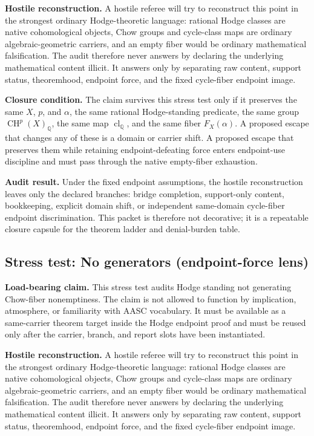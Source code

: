 \documentclass[11pt]{article}
\newcommand{\QQ}{\mathbb{Q}}
\newcommand{\CH}{\operatorname{CH}}
\newcommand{\clQ}{\operatorname{cl}_{\QQ}}
\begin{document}
\par\noindent\textbf{Hostile reconstruction.} A hostile referee will try to reconstruct this point in the strongest ordinary Hodge-theoretic language: rational Hodge classes are native cohomological objects, Chow groups and cycle-class maps are ordinary algebraic-geometric carriers, and an empty fiber would be ordinary mathematical falsification. The audit therefore never answers by declaring the underlying mathematical content illicit. It answers only by separating raw content, support status, theoremhood, endpoint force, and the fixed cycle-fiber endpoint image.

\par\noindent\textbf{Closure condition.} The claim survives this stress test only if it preserves the same $X$, $p$, and $\alpha$, the same rational Hodge-standing predicate, the same group $\CH^p(X)_\QQ$, the same map $\clQ$, and the same fiber $F_X(\alpha)$. A proposed escape that changes any of these is a domain or carrier shift. A proposed escape that preserves them while retaining endpoint-defeating force enters endpoint-use discipline and must pass through the native empty-fiber exhaustion.

\par\noindent\textbf{Audit result.} Under the fixed endpoint assumptions, the hostile reconstruction leaves only the declared branches: bridge completion, support-only content, bookkeeping, explicit domain shift, or independent same-domain cycle-fiber endpoint discrimination. This packet is therefore not decorative; it is a repeatable closure capsule for the theorem ladder and denial-burden table.


\subsection{Stress test: No generators (endpoint-force lens)}

\par\noindent\textbf{Load-bearing claim.} This stress test audits Hodge standing not generating Chow-fiber nonemptiness. The claim is not allowed to function by implication, atmosphere, or familiarity with AASC vocabulary. It must be available as a same-carrier theorem target inside the Hodge endpoint proof and must be reused only after the carrier, branch, and report slots have been instantiated.

\par\noindent\textbf{Hostile reconstruction.} A hostile referee will try to reconstruct this point in the strongest ordinary Hodge-theoretic language: rational Hodge classes are native cohomological objects, Chow groups and cycle-class maps are ordinary algebraic-geometric carriers, and an empty fiber would be ordinary mathematical falsification. The audit therefore never answers by declaring the underlying mathematical content illicit. It answers only by separating raw content, support status, theoremhood, endpoint force, and the fixed cycle-fiber endpoint image.
\end{document}
